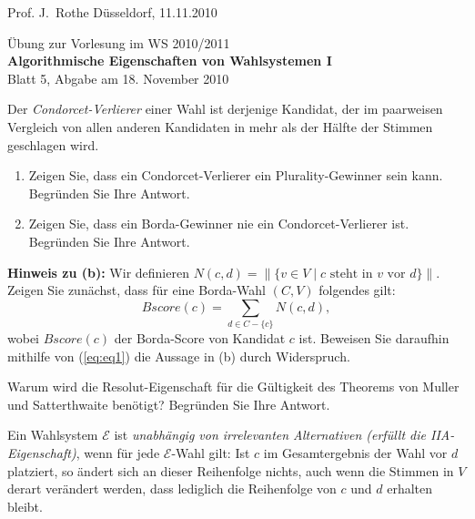 \documentclass[12pt]{article}
\newcommand\be{\begin{enumerate}}
\newcommand\ee{\end{enumerate}}
\newcommand{\vs}{\mathcal{E}}
\newcommand{\wahl}{(C,V)}
\newcommand{\bAnt}{Begr\"unden Sie Ihre Antwort.}
\begin{document}
Prof. J.~Rothe
\hfill D\"usseldorf, 11.11.2010
\vspace{0.5cm}

\begin{center}
{\Large \"Ubung zur Vorlesung im WS 2010/2011} \\
{\LARGE \bf Algorithmische Eigenschaften von Wahlsystemen I} \\
Blatt 5, Abgabe am 18. November 2010\\
\end{center}
\vspace{0.5cm}

Der \emph{Condorcet-Verlierer} einer Wahl ist derjenige Kandidat, der im paarweisen Vergleich 
von allen anderen Kandidaten in mehr als der H\"alfte der Stimmen geschlagen wird.
\be
	\item Zeigen Sie, dass ein Condorcet-Verlierer ein Plurality-Gewinner sein kann. \bAnt 
	\item Zeigen Sie, dass ein Borda-Gewinner nie ein Condorcet-Verlierer ist. \bAnt
\ee
\textbf{Hinweis zu (b):} Wir definieren $N(c,d)=\|\{v\in V \mid \mbox{$c$ steht in $v$ vor $d$}\}\|$.
Zeigen Sie zun\"achst, dass f\"ur eine Borda-Wahl $\wahl$ folgendes gilt:
\begin{equation}
	\mathit{Bscore}(c) = \sum\limits_{d\in C-\{c\}}N(c,d), \label{eq:eq1}
\end{equation}
wobei $\mathit{Bscore}(c)$ der Borda-Score von Kandidat $c$ ist. Beweisen Sie daraufhin mithilfe von
(\ref{eq:eq1}) die Aussage in (b) durch Widerspruch.

\vspace{0.5cm}

Warum wird die Resolut-Eigenschaft f\"ur die G\"ultigkeit des Theorems von Muller und
Satterthwaite ben\"otigt? \bAnt

\vspace{0.5cm}

 Ein Wahlsystem $\vs$
ist \emph{unabh\"angig von irrelevanten Alternativen (erf\"ullt die IIA-Eigenschaft)}, wenn 
f\"ur jede $\vs$-Wahl gilt: Ist $c$ im Gesamtergebnis der Wahl vor $d$ platziert, so \"andert 
sich an dieser Reihenfolge nichts, auch wenn die Stimmen in $V$ derart ver\"andert werden, 
dass lediglich die Reihenfolge von $c$ und $d$ erhalten bleibt. 
\end{document}

